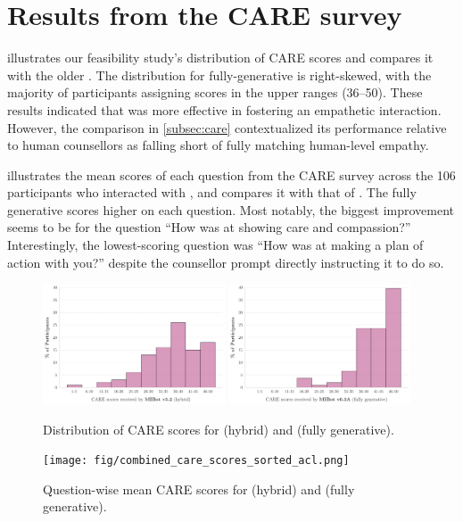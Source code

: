 \section{Results from the CARE survey}
\label{appendix:CAREdist}

 illustrates our feasibility study's distribution of CARE scores and compares it with the older \oldsysname \citep{brown2023mi}. The distribution for fully-generative \sysnamewithv is right-skewed, with the majority of participants assigning scores in the upper ranges (36–50). These results indicated that \sysname was more effective in fostering an empathetic interaction. However, the comparison in \cref{subsec:care} contextualized its performance relative to human counsellors as falling short of fully matching human-level empathy.

 illustrates the mean scores of each question from the CARE survey across the 106 participants who interacted with \sysnamewithv, and compares it with that of \oldsysname. The fully generative \sysnamewithv scores higher on each question. Most notably, the biggest improvement seems to be for the question ``How was \sysname at showing care and compassion?''
Interestingly, the lowest-scoring question was ``How was \sysname at making a plan of action with you?'' despite the counsellor prompt directly instructing it to do so.\\


\begin{figure}[H]
\centering
  \includegraphics[width=0.48\textwidth]{fig/MIV5.2_care_scores_histogram.png} \hfill
  \includegraphics[width=0.48\textwidth]{fig/2024-11-14-MIV6.3A-2024-11-22-MIV6.3A_care_scores_histogram.png}
  \caption {Distribution of CARE scores for \oldsysname (hybrid) and \sysnamewithv (fully generative).}
  \label{fig:caredist}
\end{figure}



\vspace{-0.5cm}

\begin{figure}[!htbp]
\centering
  \texttt{[image: fig/combined\_care\_scores\_sorted\_acl.png]}
  \caption {Question-wise mean CARE scores for \oldsysname (hybrid) and \sysnamewithv (fully generative).}
  \label{fig:caremean}
\end{figure}
